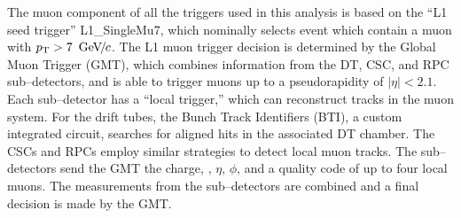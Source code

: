 The muon component of all the triggers used in this analysis is based on the
``L1 seed trigger'' L1\_SingleMu7, which nominally selects event which contain a
muon with $p_{\mathrm{T}} > 7~{\,\text{Ge\hspace{-.08em}V\hspace{-0.16em}/\hspace{-0.08em}}c}$.  The L1 muon trigger decision is determined by the
Global Muon Trigger (GMT), which combines information from the DT, CSC, and RPC
sub--detectors, and is able to trigger muons up to a pseudorapidity of $|\eta| <
2.1$.  Each sub--detector has a ``local trigger,'' which can reconstruct tracks
in the muon  system.  For the drift tubes, the Bunch Track Identifiers (BTI), a
custom integrated circuit, searches for aligned hits in the associated DT
chamber.  The CSCs and RPCs employ similar strategies to detect local muon
tracks.  The sub--detectors send the GMT the charge, \pt, $\eta$, $\phi$, and a
quality code of up to four local muons.  The measurements from the
sub--detectors are combined and a final decision is made by the GMT.
%
\ifx\master\undefined\fi
